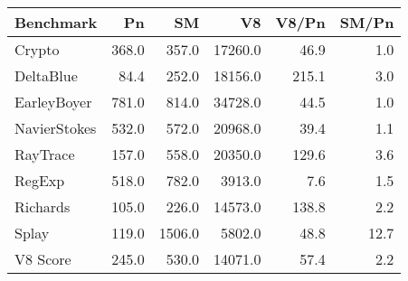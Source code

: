 \begin{tabular}{|l|r|r|r|r|r|}
  \hline
  Benchmark & Pn & SM & V8 & V8/Pn & SM/Pn \\
  \hline \hline
  Crypto & 368.0 & 357.0 & 17260.0 & 46.9 & 1.0\\
  \hline
  DeltaBlue & 84.4 & 252.0 & 18156.0 & 215.1 & 3.0\\
  \hline
  EarleyBoyer & 781.0 & 814.0 & 34728.0 & 44.5 & 1.0\\
  \hline
  NavierStokes & 532.0 & 572.0 & 20968.0 & 39.4 & 1.1\\
  \hline
  RayTrace & 157.0 & 558.0 & 20350.0 & 129.6 & 3.6\\
  \hline
  RegExp & 518.0 & 782.0 & 3913.0 & 7.6 & 1.5\\
  \hline
  Richards & 105.0 & 226.0 & 14573.0 & 138.8 & 2.2\\
  \hline
  Splay & 119.0 & 1506.0 & 5802.0 & 48.8 & 12.7\\
  \hline
  \hline
  V8 Score & 245.0 & 530.0 & 14071.0 & 57.4 & 2.2\\
  \hline
\end{tabular}
